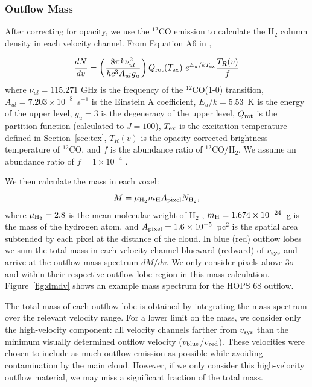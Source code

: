 \documentclass[twocolumn]{aastex63}
\newcommand{\example}{HOPS 68}
\newcommand{\co}[1][]{\ensuremath{^{#1}}CO}
\begin{document}
\subsubsection{Outflow Mass}\label{sec:dmdv}
After correcting for opacity, we use the \co[12]{} emission to calculate the H$_2$ column density in each velocity channel. From Equation A6 in \citet{ZhangY16},

\begin{equation}\label{eq:dNdv}
\frac{dN}{dv} = \left(\frac{8\pi k \nu^2_{ul}}{h c^3 A_{ul} g_u}\right) Q_{\rm rot}(T_{\rm ex})~ e^{E_u / kT_{\rm ex}} \frac{T_R(v)}{f}
\end{equation}
where $\nu_{ul} = 115.271$ GHz is the frequency of the \co[12](1-0) transition, $A_{ul} = 7.203 \times 10^{-8}$~s$^{-1}$ is the Einstein A coefficient, $E_u/k = 5.53$~K is the energy of the upper level, $g_u = 3$ is the degeneracy of the upper level, $Q_{\rm rot}$ is the partition function (calculated to $J=100$), $T_{\rm ex}$ is the excitation temperature defined in Section~\ref{sec:tex}, $T_R(v)$ is the opacity-corrected brightness temperature of \co[12]{}, and $f$ is the abundance ratio of 
\co[12]/H$_{2}$. We assume an abundance ratio of $f = 1 \times 10 ^{-4}$ \citep{Frerking82}.

We then calculate the mass in each voxel:
\begin{equation}\label{eq:mass}
M = \mu_{\rm H_2} m_{\rm H} A_{\rm pixel} N_{\rm H_2},
\end{equation}
where $\mu_{\rm H_2} = 2.8$ is the mean molecular weight of H$_2$ \citep{Kauffmann08}, $m_{\rm H} = 1.674 \times 10^{-24}$~g is the mass of the hydrogen atom, and $A_{\rm pixel} = 1.6 \times 10^{-5}$~pc$^2$ is the spatial area subtended by each pixel at the distance of the cloud. In blue (red) outflow lobes we sum the total mass in each velocity channel blueward (redward) of $v_{\rm sys}$ and arrive at the outflow mass spectrum $dM/dv$. We only consider pixels above $3\sigma$ and within their respective outflow lobe region in this mass calculation. Figure~\ref{fig:dmdv} shows an example mass spectrum for the \example{} outflow.

The total mass of each outflow lobe is obtained by integrating the mass spectrum over the relevant velocity range. For a lower limit on the mass, we consider only the high-velocity component: all velocity channels farther from $v_{\rm sys}$ than the minimum visually determined outflow velocity ($v_{\rm blue}$/$v_{\rm red}$). These velocities were chosen to include as much outflow emission as possible while avoiding contamination by the main cloud. However, if we only consider this high-velocity outflow material, we may miss a significant fraction of the total mass.
\end{document}
